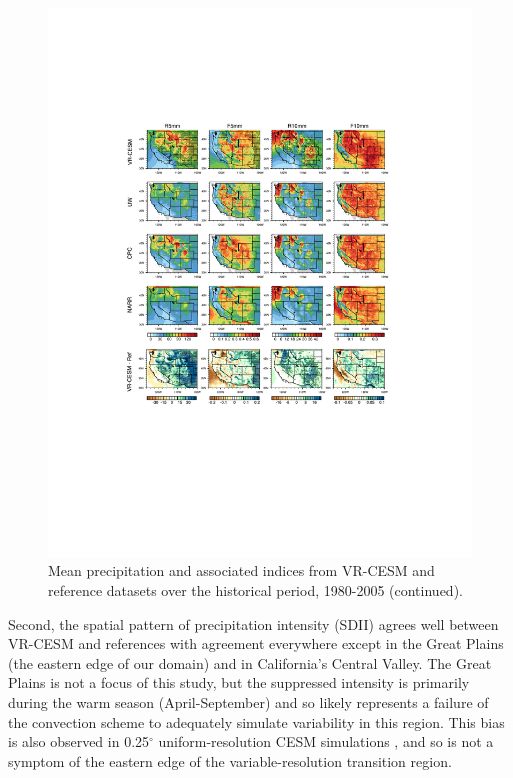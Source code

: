 \begin{figure}
\begin{center}
\includegraphics[width=6in, trim={4cm 6.5cm 4cm 4.9cm},clip]{wd_index_Hist_ref_annual_part2.pdf}
\caption{Mean precipitation and associated indices from VR-CESM and reference datasets over the historical period, 1980-2005 (continued).}
\label{fig:histEval2}
\end{center}
\end{figure}

Second, the spatial pattern of precipitation intensity (SDII) agrees well between VR-CESM and references with agreement everywhere except in the Great Plains (the eastern edge of our domain) and in California's Central Valley.  The Great Plains is not a focus of this study, but the suppressed intensity is primarily during the warm season (April-September) and so likely represents a failure of the convection scheme to adequately simulate variability in this region.  This bias is also observed in 0.25$^\circ$ uniform-resolution CESM simulations \cite{small2014new}, and so is not a symptom of the eastern edge of the variable-resolution transition region.

